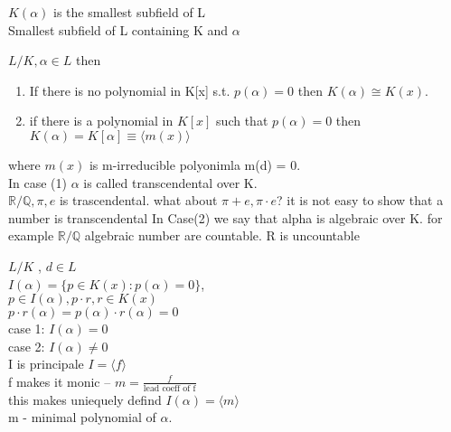 \documentclass{article}
\begin{document}
$K(\alpha)$ is the smallest subfield of L \\ 
Smallest subfield of L containing K and $\alpha$ \\
\begin{theorem}
    $L / K, \alpha \in L$ then \begin{enumerate}
        \item If there is no polynomial in K[x] s.t. $p(\alpha) = 0$ then $K(\alpha) \cong K(x)$. 
        \item if there is a polynomial in $K[x]$ such that $p(\alpha) = 0$ then $K(\alpha) = K[\alpha] \equiv \langle m(x) \rangle $
    \end{enumerate}
    where $m(x)$ is m-irreducible polyonimla  m(d) = 0. 
 \\ 
 In case (1) $\alpha$ is called transcendental over K. 
 \\ 
 $\mathbb{R} / \mathbb{Q}, \pi, e$ is trascendental. what about $\pi + e, \pi \cdot e$? it is not easy to show that a number is transcendental
In Case(2) we say that alpha is algebraic over K.
for example $\mathbb{R } / \mathbb{Q}$ algebraic number are countable. R is uncountable 
\end{theorem}
$L / K $ , $ d\in L$ \\ 
$I(\alpha) = \{p \in K(x) : p(\alpha) = 0\}$, \\ 
$ p \in I(\alpha), p\cdot r, r \in K(x) $ \\ 
$p \cdot r(\alpha) = p(\alpha) \cdot r(\alpha) = 0$ \\ 
case 1: $I(\alpha) = 0$ \\
case 2: $I(\alpha) \not = 0$ \\ 
I is principale $I = \langle f \rangle$ \\
f makes it monic -- $m = \frac{f}{\text{lead coeff of f}}$ \\ 
this makes uniequely defind $I(\alpha) = \langle m \rangle$ \\
m - minimal polynomial of $\alpha$. 
\end{document}
